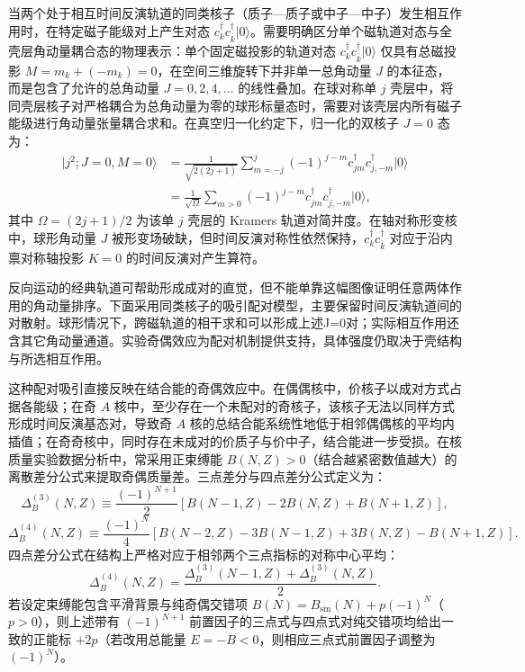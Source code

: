 当两个处于相互时间反演轨道的同类核子（质子—质子或中子—中子）发生相互作用时，在特定磁子能级对上产生对态 $c_k^\dagger c_{\bar{k}}^\dagger |0\rangle$。需要明确区分单个磁轨道对态与全壳层角动量耦合态的物理表示：单个固定磁投影的轨道对态 $c_k^\dagger c_{\bar{k}}^\dagger |0\rangle$ 仅具有总磁投影 $M = m_k + (-m_k) = 0$，在空间三维旋转下并非单一总角动量 $J$ 的本征态，而是包含了允许的总角动量 $J = 0, 2, 4, \dots$ 的线性叠加。在球对称单 $j$ 壳层中，将同壳层核子对严格耦合为总角动量为零的球形标量态时，需要对该壳层内所有磁子能级进行角动量张量耦合求和。在真空归一化约定下，归一化的双核子 $J=0$ 态为：
\begin{equation}\label{eq:2-3-2}
\begin{aligned}
|j^2; J=0, M=0\rangle &= \frac{1}{\sqrt{2(2j+1)}} \sum_{m=-j}^j (-1)^{j-m} c_{jm}^\dagger c_{j,-m}^\dagger |0\rangle \\
&= \frac{1}{\sqrt{\Omega}} \sum_{m>0} (-1)^{j-m} c_{jm}^\dagger c_{j,-m}^\dagger |0\rangle,
\end{aligned}
\end{equation}
其中 $\Omega = (2j+1)/2$ 为该单 $j$ 壳层的 Kramers 轨道对简并度。在轴对称形变核中，球形角动量 $J$ 被形变场破缺，但时间反演对称性依然保持，$c_k^\dagger c_{\bar{k}}^\dagger$ 对应于沿内禀对称轴投影 $K=0$ 的时间反演对产生算符。

反向运动的经典轨道可帮助形成成对的直觉，但不能单靠这幅图像证明任意两体作用的角动量排序。下面采用同类核子的吸引配对模型，主要保留时间反演轨道间的对散射。球形情况下，跨磁轨道的相干求和可以形成上述J=0对；实际相互作用还含其它角动量通道。实验奇偶效应为配对机制提供支持，具体强度仍取决于壳结构与所选相互作用\cite{book-suhonen-from-nucleons-to-nucleus, book-jain-nuclear-isomers}。

这种配对吸引直接反映在结合能的奇偶效应中。在偶偶核中，价核子以成对方式占据各能级；在奇 $A$ 核中，至少存在一个未配对的奇核子，该核子无法以同样方式形成时间反演基态对，导致奇 $A$ 核的总结合能系统性地低于相邻偶偶核的平均内插值；在奇奇核中，同时存在未成对的价质子与价中子，结合能进一步受损。在核质量实验数据分析中，常采用正束缚能 $B(N, Z) > 0$（结合越紧密数值越大）的离散差分公式来提取奇偶质量差。三点差分与四点差分公式定义为：
\begin{equation}\label{eq:2-3-3}
\Delta_B^{(3)}(N, Z) \equiv \frac{(-1)^{N+1}}{2} \left[ B(N-1, Z) - 2B(N, Z) + B(N+1, Z) \right],
\end{equation}
\begin{equation}\label{eq:2-3-4}
\Delta_B^{(4)}(N, Z) \equiv \frac{(-1)^N}{4} \left[ B(N-2, Z) - 3B(N-1, Z) + 3B(N, Z) - B(N+1, Z) \right].
\end{equation}
四点差分公式在结构上严格对应于相邻两个三点指标的对称中心平均：
\begin{equation}\label{eq:2-3-5}
\Delta_B^{(4)}(N, Z) = \frac{\Delta_B^{(3)}(N-1, Z) + \Delta_B^{(3)}(N, Z)}{2}.
\end{equation}
若设定束缚能包含平滑背景与纯奇偶交错项 $B(N) = B_{\mathrm{sm}}(N) + p(-1)^N$（$p > 0$），则上述带有 $(-1)^{N+1}$ 前置因子的三点式与四点式对纯交错项均给出一致的正能标 $+2p$（若改用总能量 $E = -B < 0$，则相应三点式前置因子调整为 $(-1)^N$）。

